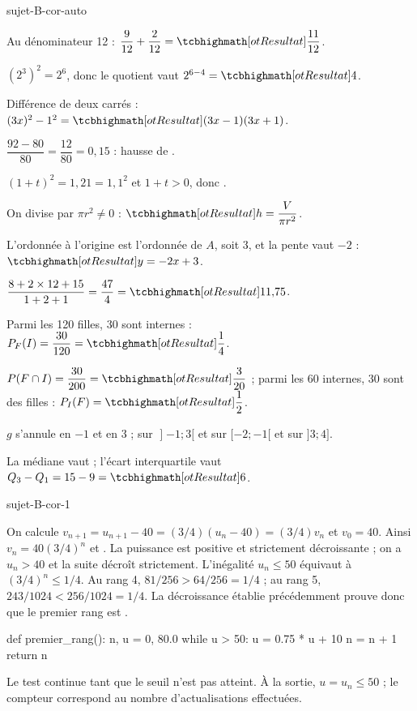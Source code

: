 \begin{blocEdition}{sujet-B-cor-auto}
\begin{questions}\item Au dénominateur 12 : $\dfrac9{12}+\dfrac2{12}=\res{\dfrac{11}{12}}$.
\item $(2^3)^2=2^6$, donc le quotient vaut $2^{6-4}=\res{4}$.
\item Différence de deux carrés : $(3x)^2-1^2=\res{(3x-1)(3x+1)}$.
\item $\dfrac{92-80}{80}=\dfrac{12}{80}=0{,}15$ : hausse de .
\item $(1+t)^2=1{,}21=1{,}1^2$ et $1+t>0$, donc .
\item On divise par $\pi r^2\neq0$ : $\res{h=\dfrac{V}{\pi r^2}}$.
\item L’ordonnée à l’origine est l’ordonnée de $A$, soit 3, et la pente vaut $-2$ : $\res{y=-2x+3}$.
\item $\dfrac{8+2\times12+15}{1+2+1}=\dfrac{47}4=\res{11{,}75}$.
\item Parmi les 120 filles, 30 sont internes : $P_F(I)=\dfrac{30}{120}=\res{\dfrac14}$.
\item $P(F\cap I)=\dfrac{30}{200}=\res{\dfrac3{20}}$ ; parmi les 60 internes, 30 sont des filles : $P_I(F)=\res{\dfrac12}$.
\item $g$ s’annule en $-1$ et en 3 ;  sur $\mathopen{]}-1;3[$ et  sur $[-2;-1[$ et sur $]3;4]$.
\item La médiane vaut  ; l’écart interquartile vaut $Q_3-Q_1=15-9=\res{6}$.\end{questions}
\label{figedition-sujet-B-cor-auto-1}
\end{blocEdition}

\begin{blocEdition}{sujet-B-cor-1}

On calcule $v_{n+1}=u_{n+1}-40=(3/4)(u_n-40)=(3/4)v_n$ et $v_0=40$.
Ainsi $v_n=40(3/4)^n$ et .
La puissance est positive et strictement décroissante ; on a $u_n>40$ et la suite décroît strictement.
L'inégalité $u_n\leq50$ équivaut à $(3/4)^n\leq1/4$.
Au rang 4, $81/256>64/256=1/4$ ; au rang 5, $243/1024<256/1024=1/4$.
La décroissance établie précédemment prouve donc que le premier rang est .
\begin{python}
def premier_rang():
    n, u = 0, 80.0
    while u > 50:
        u = 0.75 * u + 10
        n = n + 1
    return n
\end{python}
Le test  continue tant que le seuil n'est pas atteint.
À la sortie, $u=u_n\leq50$ ; le compteur correspond au nombre d'actualisations effectuées.

\end{blocEdition}

